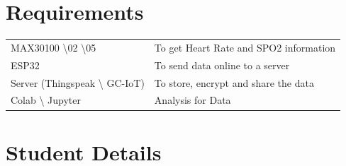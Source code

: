 \documentclass{article}
\begin{document}
\section{Requirements}

\begin{tabular}{ll}
    MAX30100 \textbackslash 02 \textbackslash 05 & To get Heart Rate and SPO2 information \\
    ESP32 & To send data online to a server \\
    Server (Thingspeak \textbackslash{} GC-IoT) & To store, encrypt and share the data \\
    Colab \textbackslash{} Jupyter & Analysis for Data\\
\end{tabular}

\section*{Student Details}
\end{document}
